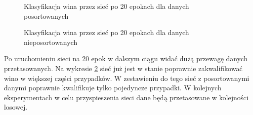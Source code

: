 \documentclass[a4paper,12pt]{article}
\numberwithin{equation}{section}
\begin{document}
\begin{figure}[H]
    \centering


    \caption{Klasyfikacja wina przez sieć po 20 epokach dla danych posortowanych}
    \label{fig:exp_2_sort_20}
    \vspace{0.5cm}
\end{figure}

\begin{figure}[H]
    \centering


    \caption{Klasyfikacja wina przez sieć po 20 epokach dla danych nieposortowanych}
    \label{fig:exp_2_shuffle_20}
\end{figure}

Po uruchomieniu sieci na 20 epok w dalszym ciągu widać dużą przewagę danych przetasowanych. Na wykresie \ref{fig:exp_2_shuffle_20} sieć już jest w stanie poprawnie zakwalifikować wino w większej części przypadków. W zestawieniu do tego sieć z posortowanymi danymi poprawnie kwalifikuje tylko pojedyncze przypadki. W kolejnych eksperymentach w celu przyspieszenia sieci dane będą przetasowane w kolejności losowej.
\end{document}
